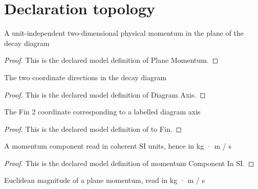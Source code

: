 \section{Declaration topology}
\begin{definition}
  \label{def:physics:phyx-mini-0556:phyxminiproblems-problemphyxmini0556-planemomentum}
  A unit-independent two-dimensional physical momentum in the plane of the decay diagram
\end{definition}
\begin{proof}
  This is the declared model definition of Plane Momentum.
\end{proof}
\begin{definition}
  \label{def:physics:phyx-mini-0556:phyxminiproblems-problemphyxmini0556-diagramaxis}
  The two coordinate directions in the decay diagram
\end{definition}
\begin{proof}
  This is the declared model definition of Diagram Axis.
\end{proof}
\begin{definition}[to Fin]
  \label{def:physics:phyx-mini-0556:phyxminiproblems-problemphyxmini0556-diagramaxis-tofin}
  The Fin 2 coordinate corresponding to a labelled diagram axis
\end{definition}
\begin{proof}
  This is the declared model definition of to Fin.
\end{proof}
\begin{definition}
  \label{def:physics:phyx-mini-0556:phyxminiproblems-problemphyxmini0556-momentumcomponentinsi}
  A momentum component read in coherent SI units, hence in kg · m / s
\end{definition}
\begin{proof}
  This is the declared model definition of momentum Component In SI.
\end{proof}
\begin{definition}
  \label{def:physics:phyx-mini-0556:phyxminiproblems-problemphyxmini0556-momentummagnitudeinsi}
  Euclidean magnitude of a plane momentum, read in kg · m / s
\end{definition}
